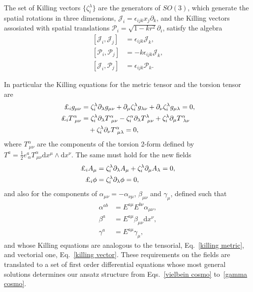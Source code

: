 \documentclass[aps,prd,12pt,superscriptaddress,showpacs,showkeys,longbibliography,reprint,nofootinbib]{revtex4-1}
\begin{document}
The set of Killing vectors $\{\zeta^\lambda_i\}$ are the generators of $SO(3)$, which generate the spatial rotations in three dimensions, $\mathcal{J}_i=\epsilon_{ijk}x_j\partial_k$, and the Killing vectors assosiated with spatial translations $\mathcal{P}_i=\sqrt{1-kr^2}\partial_i$, satisfy the algebra
\begin{align*}
  \left[\mathcal{J}_i,\mathcal{J}_j\right]&=\epsilon_{ijk}\mathcal{J}_k,\\
  \left[\mathcal{P}_i,\mathcal{P}_j\right]&=-k\epsilon_{ijk}\mathcal{J}_k,\\
  \left[\mathcal{J}_i,\mathcal{P}_j\right]&=\epsilon_{ijk}\mathcal{P}_k.
\end{align*}

In particular the Killing equations for the metric tensor and the torsion tensor are
\begin{align}
  \label{killing metric}
  \text{\textsterling}_i g_{\mu\nu}&=\zeta^\lambda_i\partial_\lambda g_{\mu\nu}+\partial_\mu\zeta^\lambda_i g_{\lambda\nu}+\partial_\nu\zeta^\lambda_i g_{\mu\lambda}=0,
  \\
  \text{\textsterling}_i T^\alpha_{\ \mu\nu}&=\zeta^\lambda_i\partial_\lambda T^\alpha_{\ \mu\nu}-\zeta^\alpha_i\partial_\lambda T^\lambda_{\ \mu\nu}
  +\zeta^\lambda_i\partial_\mu T^\alpha_{\ \lambda\nu} \notag \\
  &\quad +\zeta^\lambda_i\partial_\nu T^\alpha_{\ \mu\lambda}=0,
\end{align}
where $T^\alpha_{\ \mu\nu}$ are the components of the torsion 2-form defined by $T^a=\frac{1}{2}e^a_{\ \alpha}T^\alpha_{\ \mu\nu}\mbox{d}x^\mu\wedge\mbox{d}x^\nu$. The same must hold for the new fields
\begin{align}
  \label{killing vector}
  \text{\textsterling}_i A_\mu&=\zeta^\lambda_i\partial_\lambda A_\mu+\zeta^\lambda_i\partial_\mu A_\lambda=0,\\
  \text{\textsterling}_i \phi &=\zeta^\lambda_i\partial_\lambda\phi=0,
\end{align}
and also for the components of $\alpha_{\mu\nu}=-\alpha_{\nu\mu}$, $\beta_{\mu\nu}$ and $\gamma_\mu$, defined such that
\begin{align*}
  \alpha^{ab}&=E^{a\mu}E^{b\nu}\alpha_{\mu\nu},\\
  \beta^a&=E^{a\mu}\beta_{\mu\nu}\mbox{d}x^\nu,\\
  \gamma^a&=E^{a\mu}\gamma_\mu,
\end{align*} 
and whose Killing equations are analogous to the tensorial, Eq.~\eqref{killing metric}, and vectorial one, Eq.~\eqref{killing vector}. These requirements on the fields are translated to a set of first order differential equations whose most general solutions determines our ansatz structure from Eqs.~\eqref{vielbein cosmo} to~\eqref{gamma cosmo}. 
\end{document}
